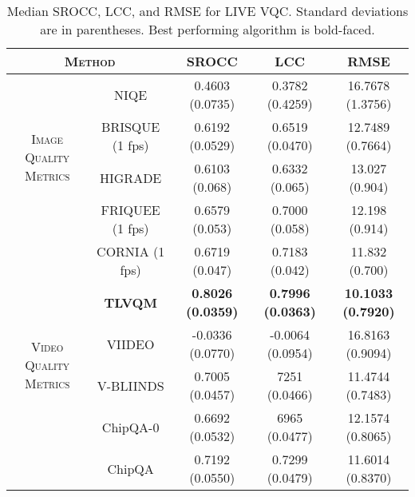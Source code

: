 \documentclass[journal]{IEEEtran}
\begin{document}
\begin{table*}
\caption{Median SROCC, LCC, and RMSE for LIVE VQC. Standard deviations are in parentheses. Best performing algorithm is bold-faced.}
\begin{center}
\begin{tabular}{|c|c|c|c|c|}
\hline
\multicolumn{2}{|c|}{\textsc{Method}}  &  SROCC & LCC & RMSE  \\  
\hline
\multirow{4}{*}{\textsc{Image Quality Metrics}} & NIQE\cite{niqe} & 0.4603 \scriptsize(0.0735) & 0.3782 \scriptsize(0.4259) & 16.7678 \scriptsize(1.3756)\\
\cline{2-5}
& BRISQUE\cite{brisque} (1 fps) &  0.6192 \scriptsize(0.0529) & 0.6519 \scriptsize(0.0470) & 12.7489 \scriptsize(0.7664)   \\
\cline{2-5}
& HIGRADE\cite{higrade} & 0.6103 \scriptsize(0.068) & 0.6332 \scriptsize(0.065) & 13.027 \scriptsize(0.904) \\
\cline{2-5}
& FRIQUEE\cite{friquee} (1 fps) & 0.6579 \scriptsize(0.053) & 0.7000 \scriptsize(0.058) & 12.198 \scriptsize(0.914) \\
\cline{2-5}
& CORNIA\cite{cornia} (1 fps) & 0.6719{ \scriptsize(0.047)} & 0.7183{ \scriptsize(0.042)} & 11.832{ \scriptsize(0.700)} \\
\hline
\multirow{4}{*}{\textsc{Video Quality Metrics}} & \textbf{TLVQM}\cite{tlvqm} &  \textbf{0.8026 \scriptsize(0.0359)} & \textbf{0.7996 \scriptsize(0.0363)} & \textbf{10.1033 \scriptsize(0.7920)}\\
\cline{2-5}
& VIIDEO\cite{viideo} & -0.0336 \scriptsize(0.0770) & -0.0064 \scriptsize(0.0954) & 16.8163 \scriptsize(0.9094) \\ 
\cline{2-5}
& V-BLIINDS\cite{vbliinds} & 0.7005 \scriptsize(0.0457)& 7251 \scriptsize(0.0466) & 11.4744 \scriptsize(0.7483) \\
\cline{2-5}
& ChipQA-0\cite{chipqa0} & 0.6692 \scriptsize(0.0532) & 6965 \scriptsize(0.0477) & 12.1574 \scriptsize(0.8065) \\
\cline{2-5}
& ChipQA & 0.7192 \scriptsize(0.0550) & 0.7299 \scriptsize(0.0479) & 11.6014 \scriptsize(0.8370) \\
\hline
\end{tabular}
\label{tab:vqc}
\end{center}
\end{table*}
\end{document}
